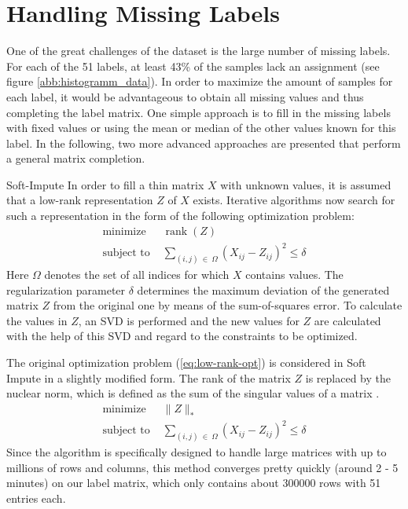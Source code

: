 \section{Handling Missing Labels}
One of the great challenges of the dataset is the large number of missing labels. For each of the 51 labels, at least 43\% of the samples lack an assignment (see figure \ref{abb:histogramm_data}). In order to maximize the amount of samples for each label, it would be advantageous to obtain all missing values and thus completing the label matrix. One simple approach is to fill in the missing labels with fixed values or using the mean or median of the other values known for this label. In the following, two more advanced approaches are presented that perform a general matrix completion.

\begin{subsection}{Soft-Impute}
	In order to fill a thin matrix $X$ with unknown values, it is assumed that a low-rank representation $Z$ of $X$ exists. Iterative algorithms now search for such a representation in the form of the following optimization problem:
	\begin{equation} \label{eq:low-rank-opt}
		\begin{split}
			\text{minimize } &\operatorname{rank}(Z) \\
			\text{subject to } &\sum_{(i,j)\:\in\: \Omega} (X_{ij} - Z_{ij})^2 \leq \delta
		\end{split}	
	\end{equation}
	Here $\Omega$ denotes the set of all indices for which $X$ contains values. The regularization parameter $\delta$ determines the maximum deviation of the generated matrix $Z$ from the original one by means of the sum-of-squares error. To calculate the values in $Z$, an SVD is performed and the new values for $Z$ are calculated with the help of this SVD and regard to the constraints to be optimized.\par \newpage
	The original optimization problem (\ref{eq:low-rank-opt}) is considered in Soft Impute in a slightly modified form. The rank of the matrix $Z$ is replaced by the nuclear norm, which is defined as the sum of the singular values of a matrix \cite{mazumder2010spectral}.	
	\begin{equation} \label{eq:low-rank-soft-opt}
	\begin{split}
	\text{minimize } & \| Z \|_* \\
	\text{subject to } &\sum_{(i,j)\:\in\: \Omega} (X_{ij} - Z_{ij})^2 \leq \delta
	\end{split}
	\end{equation}
	Since the algorithm is specifically designed to handle large matrices with up to millions of rows and columns, this method converges pretty quickly (around 2 - 5 minutes) on our label matrix, which only contains about 300000 rows with 51 entries each. 
\end{subsection}

